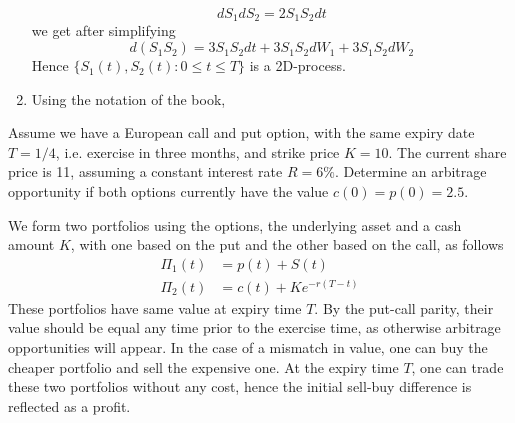 \documentclass[12pt,a4paper]{exam}
\begin{document}
\begin{questions}
\begin{solution}
\begin{enumerate}[label=(\alph*),font=\itshape]
\begin{equation*}
dS_1 dS_2 = 2S_1 S_2 dt 
\end{equation*}
we get after simplifying
\begin{equation*}
d(S_1 S_2) = 3S_1 S_2 dt + 3S_1S_2dW_1 + 3S_1S_2dW_2 
\end{equation*}
Hence  $\{S_1(t),S_2(t):0\leq t\leq T\}$ is a 2D-\ito process.
\item Using the notation of the book, 
%
\end{enumerate}
\end{solution}

\question Assume we have a European call and put option, with the same expiry date $T=1/4$, i.e. exercise in three months, and strike price $K=10$. The current share price is 11, assuming a constant interest rate $R=6\%$. Determine an arbitrage opportunity if both options currently have the value $c(0)=p(0)=2.5$.

\fillwithlines{3cm}
\begin{solution}
We form two portfolios using the options, the underlying asset and a cash amount $K$, with one based on the put and the other based on the call, as follows
\begin{equation*}
\begin{aligned}
\Pi_1(t) &= p(t) + S(t)\\
\Pi_2(t) &= c(t) + Ke^{-r(T-t)}
\end{aligned}
\end{equation*}
These portfolios have same value at expiry time $T$. By the put-call parity, their value should be equal any time prior to the exercise time, as otherwise arbitrage opportunities will appear. In the case of a mismatch in value, one can buy the cheaper portfolio and sell the expensive one. At the expiry time $T$, one can trade these two portfolios without any cost, hence the initial sell-buy difference is reflected as a profit. 


\end{solution}
\end{questions}
\end{document}
